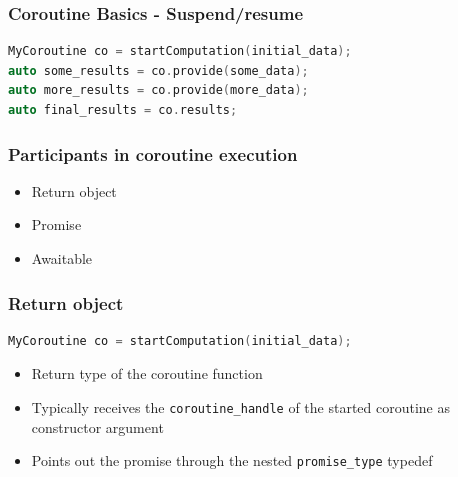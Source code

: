 \documentclass[aspectratio=169]{beamer}
\newif\iftransitions
\begin{document}
\begin{frame}[fragile]
  \frametitle{Coroutine Basics - Suspend/resume}

  \begin{lstlisting}[language={C++}]
MyCoroutine co = startComputation(initial_data);
auto some_results = co.provide(some_data);
auto more_results = co.provide(more_data);
auto final_results = co.results;
  \end{lstlisting}
\end{frame}

\begin{frame}
  \frametitle{Participants in coroutine execution}
  
  \begin{itemize}
  \item Return object
  \item Promise
  \item Awaitable
  \end{itemize}
\end{frame}

\begin{frame}[fragile]
  \frametitle{Return object}

  \begin{lstlisting}[language={C++}]
MyCoroutine co = startComputation(initial_data);
  \end{lstlisting}

  \begin{itemize}
    \item Return type of the coroutine function   \iftransitions \pause \fi
    \item Typically receives the \texttt{coroutine\_handle} of the started coroutine as constructor argument  \iftransitions \pause \fi
    \item Points out the promise through the nested \texttt{promise\_type} typedef
  \end{itemize}
\end{frame}
\end{document}
